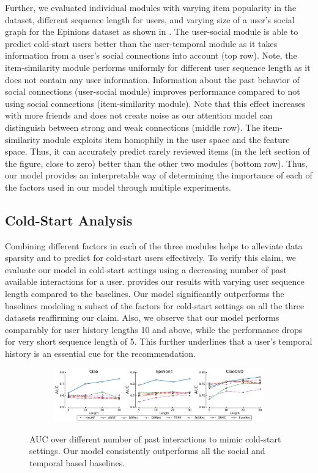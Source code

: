 Further, we evaluated individual modules with varying item popularity in the dataset, different sequence length for users, and varying size of a user's social graph for the Epinions dataset as shown in .
The user-social module is able to predict cold-start users better than the user-temporal module as it takes information from a user's social connections into account (top row). Note, the item-similarity module performs uniformly for different user sequence length as it does not contain any user information. Information about the past behavior of social connections (user-social module) improves performance compared to not using social connections (item-similarity module). Note that this effect increases with more friends and does not create noise as our attention model can distinguish between strong and weak connections (middle row).
The item-similarity module exploits item homophily in the user space and the feature space. Thus, it can accurately predict rarely reviewed items (in the left section of the figure, close to zero) better than the other two modules (bottom row).
Thus, our model provides an interpretable way of determining the importance of each of the factors used in our model through multiple experiments.


\subsection{Cold-Start Analysis} Combining different factors in each of the three modules helps to alleviate data sparsity and to predict for cold-start users effectively. To verify this claim, we evaluate our model in cold-start settings using a decreasing number of past available interactions for a user. 
provides our results with varying user sequence length compared to the baselines. Our model significantly outperforms the baselines modeling a subset of the factors for cold-start settings on all the three datasets reaffirming our claim.
Also, we observe that our model performs comparably for user history lengths 10 and above, while the performance drops for very short sequence length of 5. This further underlines that a user's temporal history is an essential cue for the recommendation.

\begin{figure}[tbh]
 \centering
 \begin{subfigure}[b]{\linewidth}
   \includegraphics[width=1\linewidth]{figures/AUC.pdf}
 \end{subfigure}
 \caption{\label{fig:ablationAUC}AUC  over different number of  past interactions to mimic cold-start settings. Our model consistently outperforms all the social and temporal based baselines.}
\end{figure}


